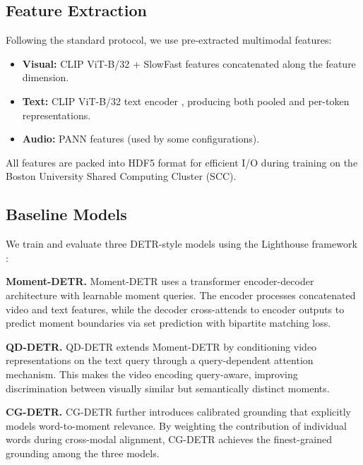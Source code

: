 \documentclass[10pt,twocolumn]{article}
\begin{document}
\subsection{Feature Extraction}
\label{sec:features}

Following the standard protocol, we use pre-extracted multimodal features:
\begin{itemize}[nosep,leftmargin=*]
  \item \textbf{Visual:} CLIP ViT-B/32 \citep{radford2021clip} + SlowFast \citep{feichtenhofer2019slowfast} features concatenated along the feature dimension.
  \item \textbf{Text:} CLIP ViT-B/32 text encoder \citep{radford2021clip}, producing both pooled and per-token representations.
  \item \textbf{Audio:} PANN \citep{kong2024pann} features (used by some configurations).
\end{itemize}

All features are packed into HDF5 format for efficient I/O during training on the Boston University Shared Computing Cluster (SCC).

\subsection{Baseline Models}
\label{sec:models}

We train and evaluate three DETR-style models using the Lighthouse framework \citep{nishimura2024lighthouse}:

\textbf{Moment-DETR.} Moment-DETR \citep{lei2021qvhighlights} uses a transformer encoder-decoder architecture with learnable moment queries. The encoder processes concatenated video and text features, while the decoder cross-attends to encoder outputs to predict moment boundaries via set prediction with bipartite matching loss.

\textbf{QD-DETR.} QD-DETR \citep{moon2023qd} extends Moment-DETR by conditioning video representations on the text query through a query-dependent attention mechanism. This makes the video encoding query-aware, improving discrimination between visually similar but semantically distinct moments.

\textbf{CG-DETR.} CG-DETR \citep{moon2023cg} further introduces calibrated grounding that explicitly models word-to-moment relevance. By weighting the contribution of individual words during cross-modal alignment, CG-DETR achieves the finest-grained grounding among the three models.
\end{document}
